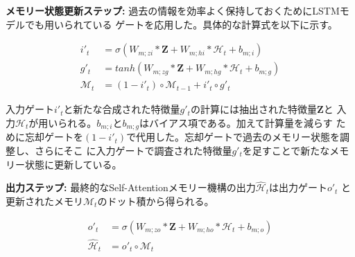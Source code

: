 \textbf{メモリー状態更新ステップ: }過去の情報を効率よく保持しておくためにLSTMモデルでも用いられている
ゲートを応用した。具体的な計算式を以下に示す。

\begin{align}
i'_{t} &= \sigma(W_{m;zi} \ast \boldsymbol{Z} + W_{m;hi} \ast \mathcal{H}_{t} + b_{m;i}) \\
g'_{t} &= tanh(W_{m;zg} \ast \boldsymbol{Z} + W_{m;hg} \ast \mathcal{H}_{t} + b_{m;g}) \\
\mathcal{M}_{t} &= (1 - i'_{t}) \circ \mathcal{M}_{t-1} + i'_{t} \circ g'_{t}
\end{align}

入力ゲート$i'_{t}$と新たな合成された特徴量$g'_{t}$の計算には抽出された特徴量$\boldsymbol{Z}$と
入力$\mathcal{H}_{t}$が用いられる。$b_{m;i}$と$b_{m;g}$はバイアス項である。加えて計算量を減らす
ために忘却ゲートを$(1 - i'_{t})$で代用した。忘却ゲートで過去のメモリー状態を調整し、さらにそこ
に入力ゲートで調査された特徴量$g'_{t}$を足すことで新たなメモリー状態に更新している。

\textbf{出力ステップ: }最終的なSelf-Attentionメモリー機構の出力$\hat{\mathcal{H}}_{t}$は出力ゲート$o'_{t}$
と更新されたメモリ$\mathcal{M}_{t}$のドット積から得られる。

\begin{align}
o'_{t} &= \sigma(W_{m;zo} \ast \boldsymbol{Z} + W_{m;ho} \ast \mathcal{H}_{t} + b_{m;o}) \\
\hat{\mathcal{H}}_{t} &= o'_{t} \circ \mathcal{M}_{t}
\end{align}

